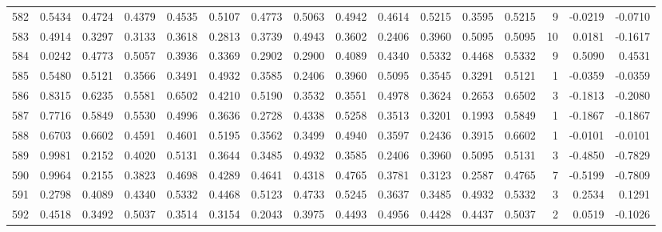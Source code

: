 \begin{tabular}{lrrrrrrrrrrrrrrr}
582 &      0.5434 &  0.4724 &  0.4379 &  0.4535 &  0.5107 &  0.4773 &  0.5063 &  0.4942 &  0.4614 &  0.5215 &   0.3595 &     0.5215 &      9 &                   -0.0219 &                    -0.0710 \\
583 &      0.4914 &  0.3297 &  0.3133 &  0.3618 &  0.2813 &  0.3739 &  0.4943 &  0.3602 &  0.2406 &  0.3960 &   0.5095 &     0.5095 &     10 &                    0.0181 &                    -0.1617 \\
584 &      0.0242 &  0.4773 &  0.5057 &  0.3936 &  0.3369 &  0.2902 &  0.2900 &  0.4089 &  0.4340 &  0.5332 &   0.4468 &     0.5332 &      9 &                    0.5090 &                     0.4531 \\
585 &      0.5480 &  0.5121 &  0.3566 &  0.3491 &  0.4932 &  0.3585 &  0.2406 &  0.3960 &  0.5095 &  0.3545 &   0.3291 &     0.5121 &      1 &                   -0.0359 &                    -0.0359 \\
586 &      0.8315 &  0.6235 &  0.5581 &  0.6502 &  0.4210 &  0.5190 &  0.3532 &  0.3551 &  0.4978 &  0.3624 &   0.2653 &     0.6502 &      3 &                   -0.1813 &                    -0.2080 \\
587 &      0.7716 &  0.5849 &  0.5530 &  0.4996 &  0.3636 &  0.2728 &  0.4338 &  0.5258 &  0.3513 &  0.3201 &   0.1993 &     0.5849 &      1 &                   -0.1867 &                    -0.1867 \\
588 &      0.6703 &  0.6602 &  0.4591 &  0.4601 &  0.5195 &  0.3562 &  0.3499 &  0.4940 &  0.3597 &  0.2436 &   0.3915 &     0.6602 &      1 &                   -0.0101 &                    -0.0101 \\
589 &      0.9981 &  0.2152 &  0.4020 &  0.5131 &  0.3644 &  0.3485 &  0.4932 &  0.3585 &  0.2406 &  0.3960 &   0.5095 &     0.5131 &      3 &                   -0.4850 &                    -0.7829 \\
590 &      0.9964 &  0.2155 &  0.3823 &  0.4698 &  0.4289 &  0.4641 &  0.4318 &  0.4765 &  0.3781 &  0.3123 &   0.2587 &     0.4765 &      7 &                   -0.5199 &                    -0.7809 \\
591 &      0.2798 &  0.4089 &  0.4340 &  0.5332 &  0.4468 &  0.5123 &  0.4733 &  0.5245 &  0.3637 &  0.3485 &   0.4932 &     0.5332 &      3 &                    0.2534 &                     0.1291 \\
592 &      0.4518 &  0.3492 &  0.5037 &  0.3514 &  0.3154 &  0.2043 &  0.3975 &  0.4493 &  0.4956 &  0.4428 &   0.4437 &     0.5037 &      2 &                    0.0519 &                    -0.1026 \\

\end{tabular}
